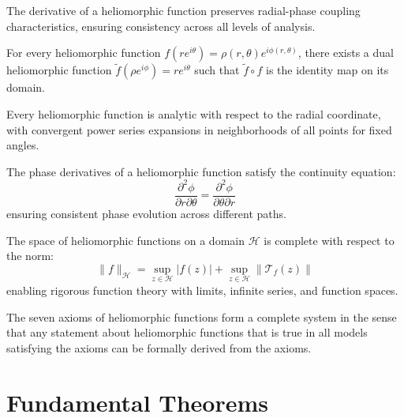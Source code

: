 \begin{axiom}
The derivative of a heliomorphic function preserves radial-phase coupling characteristics, ensuring consistency across all levels of analysis.
\end{axiom}

\begin{axiom}
For every heliomorphic function $f(re^{i\theta}) = \rho(r,\theta)e^{i\phi(r,\theta)}$, there exists a dual heliomorphic function $\tilde{f}(\rho e^{i\phi}) = re^{i\theta}$ such that $\tilde{f} \circ f$ is the identity map on its domain.
\end{axiom}

\begin{axiom}
Every heliomorphic function is analytic with respect to the radial coordinate, with convergent power series expansions in neighborhoods of all points for fixed angles.
\end{axiom}

\begin{axiom}
The phase derivatives of a heliomorphic function satisfy the continuity equation:
\begin{equation}
\frac{\partial^2 \phi}{\partial r \partial \theta} = \frac{\partial^2 \phi}{\partial \theta \partial r}
\end{equation}
ensuring consistent phase evolution across different paths.
\end{axiom}

\begin{axiom}[Completeness]
The space of heliomorphic functions on a domain $\mathcal{H}$ is complete with respect to the norm:
\begin{equation}
\|f\|_{\mathcal{H}} = \sup_{z \in \mathcal{H}} |f(z)| + \sup_{z \in \mathcal{H}} \|\mathcal{T}_f(z)\|
\end{equation}
enabling rigorous function theory with limits, infinite series, and function spaces.
\end{axiom}

\begin{theorem}
The seven axioms of heliomorphic functions form a complete system in the sense that any statement about heliomorphic functions that is true in all models satisfying the axioms can be formally derived from the axioms.
\end{theorem}

\section{Fundamental Theorems}

